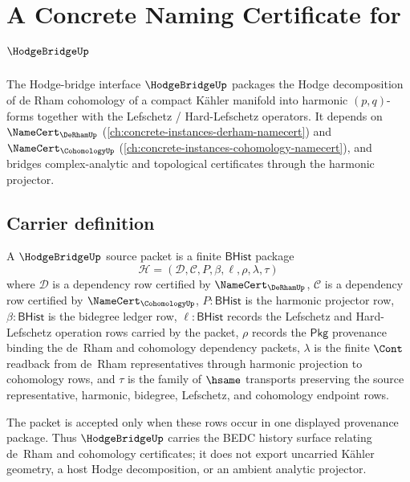 \chapter{A Concrete Naming Certificate for $\HodgeBridgeUp$}
\label{ch:concrete-instances-hodgebridge-namecert}

The Hodge-bridge interface $\HodgeBridgeUp$ packages the Hodge decomposition of de Rham cohomology of a compact K\"{a}hler manifold into harmonic $(p,q)$-forms together with the Lefschetz / Hard-Lefschetz operators. It depends on $\NameCert_{\DeRhamUp}$ (\autoref{ch:concrete-instances-derham-namecert}) and $\NameCert_{\CohomologyUp}$ (\autoref{ch:concrete-instances-cohomology-namecert}), and bridges complex-analytic and topological certificates through the harmonic projector.

\section{Carrier definition}
\label{sec:hodgebridge-carrier}

\begin{definition}
\label{def:hodgebridge-bhist-source-packet}
A $\HodgeBridgeUp$ source packet is a finite $\mathsf{BHist}$ package
$$
\mathcal{H}=(\mathcal{D},\mathcal{C},P,\beta,\ell,\rho,\lambda,\tau)
$$
where $\mathcal{D}$ is a dependency row certified by $\NameCert_{\DeRhamUp}$, $\mathcal{C}$ is a dependency row certified by $\NameCert_{\CohomologyUp}$, $P:\mathsf{BHist}$ is the harmonic projector row, $\beta:\mathsf{BHist}$ is the bidegree ledger row, $\ell:\mathsf{BHist}$ records the Lefschetz and Hard-Lefschetz operation rows carried by the packet, $\rho$ records the $\mathsf{Pkg}$ provenance binding the de~Rham and cohomology dependency packets, $\lambda$ is the finite $\Cont$ readback from de~Rham representatives through harmonic projection to cohomology rows, and $\tau$ is the family of $\hsame$ transports preserving the source representative, harmonic, bidegree, Lefschetz, and cohomology endpoint rows.

The packet is accepted only when these rows occur in one displayed provenance package. Thus $\HodgeBridgeUp$ carries the BEDC history surface relating de~Rham and cohomology certificates; it does not export uncarried K\"{a}hler geometry, a host Hodge decomposition, or an ambient analytic projector.
\end{definition}

